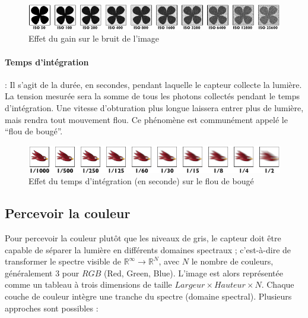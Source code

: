 \documentclass[../thesis.tex]{subfiles}
\begin{document}
    \begin{figure}[H]
        \centering
        \includegraphics[width=\linewidth]{img/biblio/camera-iso}
        \caption{Effet du gain sur le bruit de l'image}
        \label{fig:03-camera-iso}
    \end{figure}
    
    \vspace{-0.5em}
    \paragraph{Temps d'intégration}: Il s'agit de la durée, en secondes, pendant laquelle le capteur collecte la lumière. La tension mesurée sera la somme de tous les photons collectés pendant le temps d'intégration. Une vitesse d'obturation plus longue laissera entrer plus de lumière, mais rendra tout mouvement flou.  Ce phénomène est communément appelé le ``flou de bougé''.
    
    \begin{figure}[H]
        \centering
        \includegraphics[width=\linewidth]{img/biblio/camera-integration}
        \caption{Effet du temps d'intégration (en seconde) sur le flou de bougé}
        \label{fig:03-camera-integration}
    \end{figure}
    
    \newpage
    \subsection{Percevoir la couleur}
    \label{sec:percevoir-couleur}
    
    Pour percevoir la couleur plutôt que les niveaux de gris, le capteur doit être capable de séparer la lumière en différents domaines spectraux ; c'est-à-dire de transformer le spectre visible de $\mathbb{R}^\infty \rightarrow \mathbb{R}^{N}$, avec $N$ le nombre de couleurs, généralement $3$ pour $RGB$  (Red, Green, Blue). L'image est alors représentée comme un tableau à trois dimensions de taille $Largeur \times Hauteur \times N$. Chaque couche de couleur intègre une tranche du spectre (domaine spectral). Plusieurs approches sont possibles :
    
\end{document}
